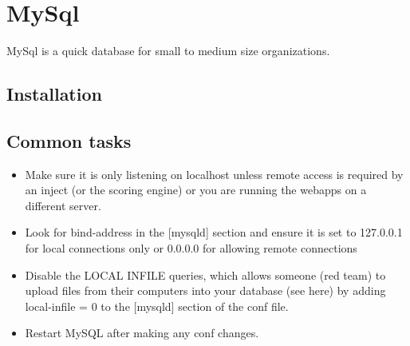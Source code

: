 \section{MySql}

MySql is a quick database for small to medium size organizations.

\subsection{Installation}
\subsection{Common tasks}


\begin{itemize}
	\item Make sure it is only listening on localhost unless remote access is required by an inject (or the scoring engine) or you are running the webapps on a different server.
	\item Look for bind-address in the [mysqld] section and ensure it is set to 127.0.0.1 for local connections only or 0.0.0.0 for allowing remote connections
	\item Disable the LOCAL INFILE queries, which allows someone (red team) to upload files from their computers into your database (see here) by adding local-infile = 0 to the [mysqld] section of the conf file.
	\item Restart MySQL after making any conf changes.
\end{itemize}
